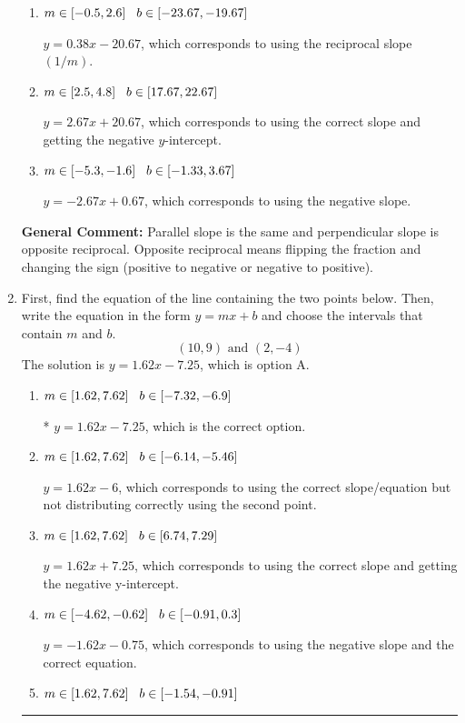 \documentclass{extbook}[14pt]
\newcommand{\litem}[1]{\item #1

\rule{\textwidth}{0.4pt}}
\begin{document}
\begin{enumerate}
{\begin{enumerate}[label=\Alph*.]
* $y = 2.67x - 20.67$, which is the correct option.
\item \( m \in [-0.5, 2.6] \hspace*{3mm} b \in [-23.67, -19.67] \)

 $y = 0.38x - 20.67$, which corresponds to using the reciprocal slope $(1/m)$.
\item \( m \in [2.5, 4.8] \hspace*{3mm} b \in [17.67, 22.67] \)

 $y = 2.67x + 20.67$, which corresponds to using the correct slope and getting the negative $y$-intercept.
\item \( m \in [-5.3, -1.6] \hspace*{3mm} b \in [-1.33, 3.67] \)

 $y = -2.67x + 0.67$, which corresponds to using the negative slope.
\end{enumerate}

\textbf{General Comment:} Parallel slope is the same and perpendicular slope is opposite reciprocal. Opposite reciprocal means flipping the fraction and changing the sign (positive to negative or negative to positive).
}
\litem{
First, find the equation of the line containing the two points below. Then, write the equation in the form $ y=mx+b $ and choose the intervals that contain $m$ and $b$.
\[ (10, 9) \text{ and } (2, -4) \]The solution is \( y = 1.62x -7.25 \), which is option A.\begin{enumerate}[label=\Alph*.]
\item \( m \in [1.62, 7.62] \hspace*{3mm} b \in [-7.32, -6.9] \)

* $y = 1.62x -7.25$, which is the correct option.
\item \( m \in [1.62, 7.62] \hspace*{3mm} b \in [-6.14, -5.46] \)

 $y = 1.62x -6$, which corresponds to using the correct slope/equation but not distributing correctly using the second point.
\item \( m \in [1.62, 7.62] \hspace*{3mm} b \in [6.74, 7.29] \)

 $y = 1.62x + 7.25$, which corresponds to using the correct slope and getting the negative y-intercept.
\item \( m \in [-4.62, -0.62] \hspace*{3mm} b \in [-0.91, 0.3] \)

 $y = -1.62x -0.75$, which corresponds to using the negative slope and the correct equation.
\item \( m \in [1.62, 7.62] \hspace*{3mm} b \in [-1.54, -0.91] \)


\end{enumerate}}
\end{enumerate}
\end{document}
